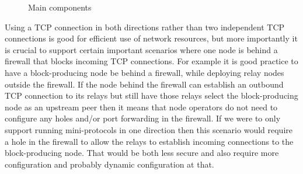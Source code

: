 \begin{figure}[h]
  \caption{Main components}
  \label{tik:components}
\end{figure}

Using a TCP connection in both directions rather than two independent TCP
connections is good for efficient use of network resources, but more importantly
it is crucial to support certain important scenarios where one node is behind a
firewall that blocks incoming TCP connections. For example it is good practice
to have a block-producing node be behind a firewall, while deploying relay nodes
outside the firewall. If the node behind the firewall can establish an outbound
TCP connection to its relays but still have those relays select the
block-producing node as an upstream peer then it means that node operators do
not need to configure any holes and/or port forwarding in the firewall. If we
were to only support running mini-protocols in one direction then this scenario
would require a hole in the firewall to allow the relays to establish incoming
connections to the block-producing node. That would be both less secure and also
require more configuration and probably dynamic configuration at that.


